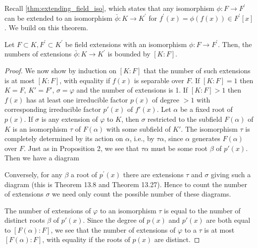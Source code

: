   Recall \ref{thm:extending_field_iso}, which states that any isomorphism $\phi: F \to F^\prime$ can be extended to an isomorphism $\bar{\phi}: K \to K^\prime$ for $f^\prime (x) = \phi(f(x)) \in F^\prime[x]$. We build on this theorem. 

  \begin{theorem}
    Let $F \subset K, F^\prime \subset K^\prime$ be field extensions with an isomorphism $\phi:F \to F^\prime$. Then, the numbers of extensions $\bar{\phi}: K \to K^\prime$ is bounded by $[K:F]$. 
  \end{theorem}
  \begin{proof}
    We now show by induction on $[K : F]$ that the number of such extensions is at most $[K : F]$, with equality if $f(x)$ is separable over $F$. If $[K : F] = 1$ then $K = F$, $K' = F'$, $\sigma = \varphi$ and the number of extensions is 1. If $[K : F] > 1$ then $f(x)$ has at least one irreducible factor $p(x)$ of degree $> 1$ with corresponding irreducible factor $p'(x)$ of $f'(x)$. Let $\alpha$ be a fixed root of $p(x)$. If $\sigma$ is any extension of $\varphi$ to $K$, then $\sigma$ restricted to the subfield $F(\alpha)$ of $K$ is an isomorphism $\tau$ of $F(\alpha)$ with some subfield of $K'$. The isomorphism $\tau$ is completely determined by its action on $\alpha$, i.e., by $\tau\alpha$, since $\alpha$ generates $F(\alpha)$ over $F$. Just as in Proposition 2, we see that $\tau\alpha$ must be some root $\beta$ of $p'(x)$. Then we have a diagram

    \begin{figure}[H]
      \centering 
    \end{figure}

    Conversely, for any $\beta$ a root of $p^\prime(x)$ there are extensions $\tau$ and $\sigma$ giving such a diagram (this is Theorem 13.8 and Theorem 13.27). Hence to count the number of extensions $\sigma$ we need only count the possible number of these diagrams.

    The number of extensions of $\varphi$ to an isomorphism $\tau$ is equal to the number of distinct roots $\beta$ of $p'(x)$. Since the degree of $p(x)$ and $p'(x)$ are both equal to $[F(\alpha) : F]$, we see that the number of extensions of $\varphi$ to a $\tau$ is at most $[F(\alpha) : F]$, with equality if the roots of $p(x)$ are distinct.


\end{proof}
